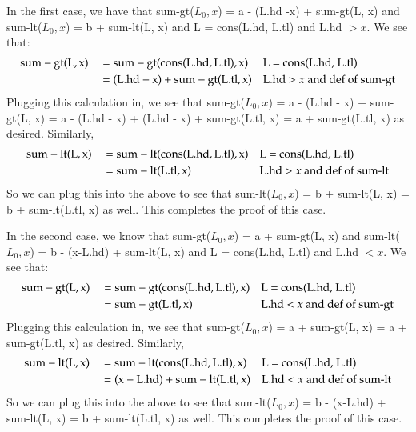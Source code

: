 \documentclass[12pt]{article}
\theoremstyle{definitionstyle}
\begin{document}
\begin{enumerate}[labelindent=0pt, labelwidth=!, wide]
            In the first case, we have that sum-gt($L_0, x$) = a - (L.hd -x) + sum-gt(L, x) and sum-lt($L_0, x$) = b + sum-lt(L, x) and L = cons(L.hd, L.tl) and L.hd $> x$. We see that:
            \begin{align*}
                \begin{aligned}
                    &\rm sum-gt(L, x) &&= \rm sum-gt(cons(L.hd, L.tl), x) &&\text{\rm L = cons(L.hd, L.tl)} \\
                    &&&= \rm (L.hd - x) + sum-gt(L.tl, x) &&\text{L.hd $>x$ and def of sum-gt}
                \end{aligned}
            \end{align*}
            Plugging this calculation in, we see that sum-gt($L_0, x$) = a - (L.hd - x) + sum-gt(L, x) = a - (L.hd - x) + (L.hd - x) + sum-gt(L.tl, x) = a + sum-gt(L.tl, x) as desired.  Similarly,
            \begin{align*}
                \begin{aligned}
                    &\rm sum-lt(L, x) &&= \rm sum-lt(cons(L.hd, L.tl), x) &&\text{\rm L = cons(L.hd, L.tl)} \\
                    &&&= \rm sum-lt(L.tl, x) &&\text{L.hd $>x$ and def of sum-lt}
                \end{aligned}
            \end{align*}
            So we can plug this into the above to see that sum-lt($L_0, x$) = b + sum-lt(L, x) = b + sum-lt(L.tl, x) as well. This completes the proof of this case.
        
            In the second case, we know that sum-gt($L_0, x$) = a + sum-gt(L, x) and sum-lt($L_0, x$) = b - (x-L.hd) + sum-lt(L, x) and L = cons(L.hd, L.tl) and L.hd $< x$. We see that:
            \begin{align*}
                \begin{aligned}
                    &\rm sum-gt(L, x) &&= \rm sum-gt(cons(L.hd, L.tl), x) &&\text{\rm L = cons(L.hd, L.tl)} \\
                    &&&= \rm sum-gt(L.tl, x) &&\text{L.hd $<x$ and def of sum-gt}
                \end{aligned}
            \end{align*}
            Plugging this calculation in, we see that sum-gt($L_0, x$) = a + sum-gt(L, x) = a + sum-gt(L.tl, x) as desired.  Similarly,
            \begin{align*}
                \begin{aligned}
                    &\rm sum-lt(L, x) &&= \rm sum-lt(cons(L.hd, L.tl), x) &&\text{\rm L = cons(L.hd, L.tl)} \\
                    &&&= \rm (x - L.hd) + sum-lt(L.tl, x) &&\text{L.hd $<x$ and def of sum-lt}
                \end{aligned}
            \end{align*}
            So we can plug this into the above to see that sum-lt($L_0, x$) = b - (x-L.hd) + sum-lt(L, x) = b + sum-lt(L.tl, x) as well. This completes the proof of this case.
        

\end{enumerate}
\end{document}
